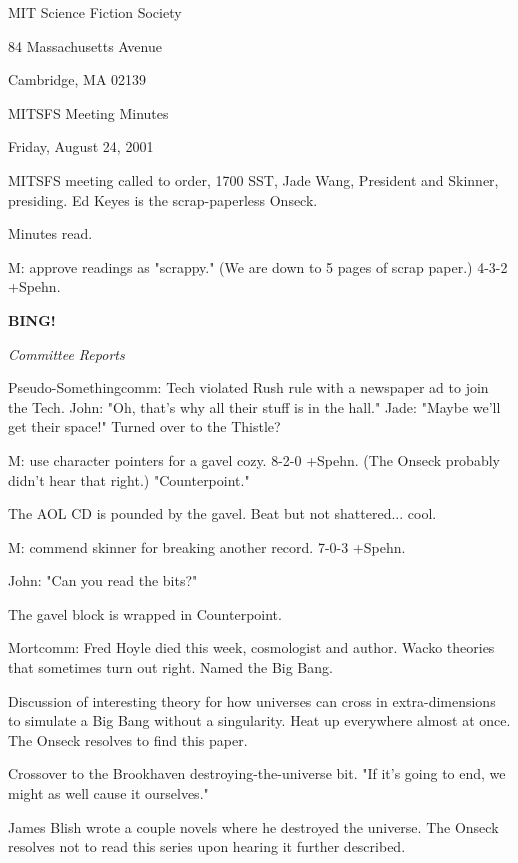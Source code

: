 \documentclass[12pt]{article}
\newcommand{\bing}{{\bf BING!} }
\newcommand{\goto}[1]{\bing \vskip 12pt \centerline{{\em{#1}}}}
\begin{document}
\begin{center}

MIT Science Fiction Society 

84 Massachusetts Avenue

Cambridge, MA 02139

\vspace{12pt}

MITSFS Meeting Minutes 

Friday, August 24, 2001

\end{center}
 
\vspace{18pt}

\setlength{\parskip}{6pt}

\noindent
MITSFS meeting called to order, 1700 SST, Jade Wang, President and
Skinner, presiding.  Ed Keyes is the scrap-paperless Onseck.

Minutes read.

M: approve readings as "scrappy." (We are down to 5 pages of scrap paper.) 4-3-2 +Spehn.

\goto{Committee Reports}

Pseudo-Somethingcomm: Tech violated Rush rule with a newspaper ad to join the Tech. John: "Oh, that's why all their stuff is in the hall." Jade: "Maybe we'll get their space!" Turned over to the Thistle?

M: use character pointers for a gavel cozy. 8-2-0 +Spehn. (The Onseck probably didn't hear that right.) "Counterpoint."

The AOL CD is pounded by the gavel. Beat but not shattered... cool.

M: commend skinner for breaking another record. 7-0-3 +Spehn.

John: "Can you read the bits?"

The gavel block is wrapped in Counterpoint.

Mortcomm: Fred Hoyle died this week, cosmologist and author. Wacko theories that sometimes turn out right. Named the Big Bang.

Discussion of interesting theory for how universes can cross in extra-dimensions to simulate a Big Bang without a singularity. Heat up everywhere almost at once. The Onseck resolves to find this paper.

Crossover to the Brookhaven destroying-the-universe bit. "If it's going to end, we might as well cause it ourselves."

James Blish wrote a couple novels where he destroyed the universe. The Onseck resolves not to read this series upon hearing it further described.
\end{document}
